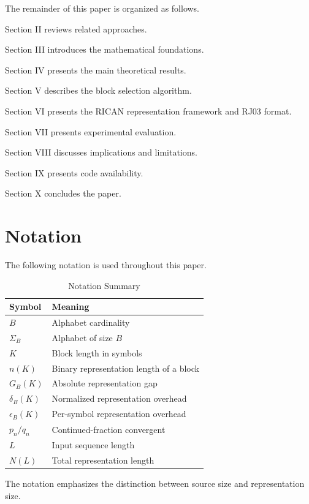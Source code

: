 \documentclass[onecolumn]{IEEEtran}
\begin{document}
The remainder of this paper is organized as follows.

Section II reviews related approaches.

Section III introduces the mathematical foundations.

Section IV presents the main theoretical results.

Section V describes the block selection algorithm.

Section VI presents the RICAN representation framework and RJ03 format.

Section VII presents experimental evaluation.

Section VIII discusses implications and limitations.

Section IX presents code availability.

Section X concludes the paper.


\section{Notation}

The following notation is used throughout this paper.

\begin{table}[!t]
\caption{Notation Summary}
\label{tab:notation}
\centering
\begin{tabular}{ll}
\toprule
Symbol & Meaning\\
\midrule
$B$ & Alphabet cardinality\\
$\Sigma_B$ & Alphabet of size $B$\\
$K$ & Block length in symbols\\
$n(K)$ & Binary representation length of a block\\
$G_B(K)$ & Absolute representation gap\\
$\delta_B(K)$ & Normalized representation overhead\\
$\epsilon_B(K)$ & Per-symbol representation overhead\\
$p_n/q_n$ & Continued-fraction convergent\\
$L$ & Input sequence length\\
$N(L)$ & Total representation length\\
\bottomrule
\end{tabular}
\end{table}

The notation emphasizes the distinction between source size and
representation size.
\end{document}

